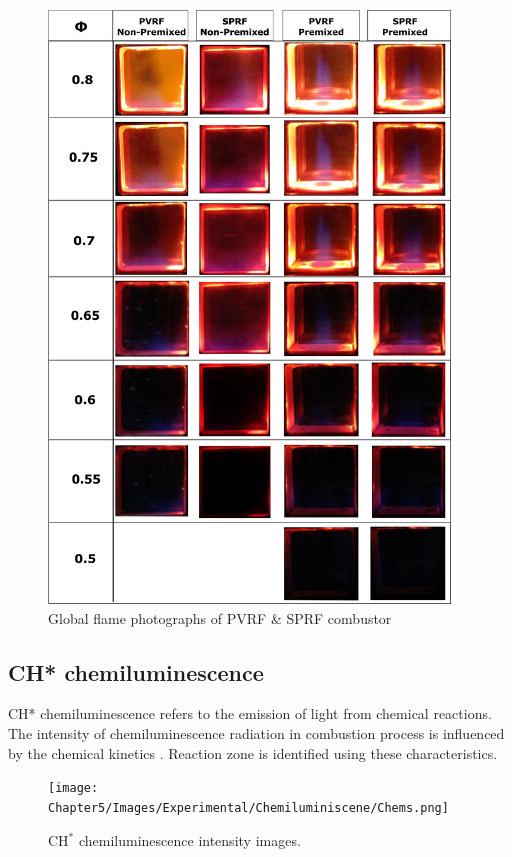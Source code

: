 \begin{figure}[h!]
	\centering
        \includegraphics[width=0.95\textwidth]{Chapter5/Images/Experimental/Global images/Global.png}
	\caption{Global flame photographs of PVRF \& SPRF combustor}
	\label{global}

\end{figure}

\subsection{CH* chemiluminescence}
CH* chemiluminescence refers to the emission of light from chemical reactions. The intensity of chemiluminescence radiation in combustion process is influenced by the chemical kinetics \cite{AHMAD2023101200}. Reaction zone is identified using these characteristics.

\begin{figure}[h!]
	\centering
        \texttt{[image: Chapter5/Images/Experimental/Chemiluminiscene/Chems.png]}
	\caption{CH$^*$ chemiluminescence intensity images.}
	\label{SENP_chems}
\end{figure}

